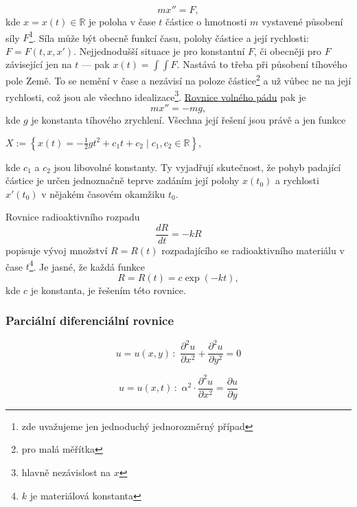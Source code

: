 \documentclass[../main.tex]{subfiles}
\begin{document}
\begin{example}
    \[ mx'' = F, \]
    kde $x=x(t)\in\mathbb{R}$ je poloha v čase $t$ částice o hmotnosti $m$ vystavené působení síly $F$\footnote{zde uvažujeme jen jednoduchý jednorozměrný případ}.
    Síla může být obecně funkcí času, polohy částice a její rychlosti: $F = F(t,x,x')$. Nejjednodušší situace je pro konstantní $F$,
    či obecněji pro $F$ závisející jen na $t$ --- pak $x(t) = \int\int F$. Nastává to třeba při působení
    tíhového pole Země. To se nemění v čase a nezávisí na poloze částice\footnote{pro malá měřítka} a už vůbec ne na její rychlosti,
    což jsou ale všechno idealizace\footnote{hlavně nezávislost na $x$}.
    \underline{Rovnice volného pádu} pak je 
    \[ mx'' = -mg, \]
    kde $g$ je konstanta tíhového zrychlení.
    Všechna její řešení jsou právě a jen funkce
    \begin{center} $ X := \left\{ x(t) = -\frac{1}{2}gt^2 + c_1t + c_2 \mid c_1,c_2 \in \mathbb{R} \right\}, $ \end{center}
    kde $c_1$ a $c_2$ jsou libovolné konstanty. Ty vyjadřují skutečnost, že pohyb padající částice
    je určen jednoznačně teprve zadáním její polohy $x(t_0)$ a rychlosti $x'(t_0)$ v nějakém časovém okamžiku $t_0$.
\end{example}

\begin{example}
    Rovnice radioaktivního rozpadu
    \[ \frac{dR}{dt} = -kR \]
    popisuje vývoj množství $R = R(t)$ rozpadajícího se radioaktivního materiálu v čase $t$\footnote{$k$ je materiálová konstanta}.
    Je jasné, že každá funkce
    \[ R = R(t) = c \exp(-kt), \]
    kde $c$ je konstanta, je řešením této rovnice.
\end{example}

\subsubsection{Parciální diferenciální rovnice}

\begin{example}
    \[ u = u(x,y)\, : \,\, \frac{\partial^2 u}{\partial x^2} + \frac{\partial^2 u}{\partial y^2} = 0 \]
\end{example}

\begin{example}
    \[ u = u(x,t)\, : \,\, \alpha^2 \cdot \frac{\partial^2 u}{\partial x^2} = \frac{\partial u}{\partial y} \]
\end{example}
\end{document}
